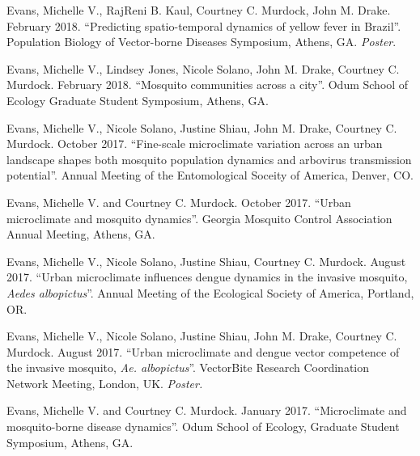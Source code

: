 
\begin{cvitems}
	\bigskip

	\item Evans, Michelle V., RajReni B. Kaul, Courtney C. Murdock, John M. Drake. February 2018. ``Predicting spatio-temporal dynamics of yellow fever in Brazil''. Population Biology of Vector-borne Diseases Symposium, Athens, GA. \textit{Poster}.

	\item Evans, Michelle V., Lindsey Jones, Nicole Solano, John M. Drake, Courtney C. Murdock. February 2018. ``Mosquito communities across a city''. Odum School of Ecology Graduate Student Symposium, Athens, GA.

	\item Evans, Michelle V., Nicole Solano, Justine Shiau, John M. Drake, Courtney C. Murdock. October 2017. ``Fine-scale microclimate variation across an urban landscape shapes both mosquito population dynamics and arbovirus transmission potential''. Annual Meeting of the Entomological Soceity of America, Denver, CO.

	\item Evans, Michelle V. and Courtney C. Murdock. October 2017. ``Urban microclimate and mosquito dynamics''. Georgia Mosquito Control Association Annual Meeting, Athens, GA.

	\item Evans, Michelle V., Nicole Solano, Justine Shiau, Courtney C. Murdock. August 2017. ``Urban microclimate influences dengue dynamics in the invasive mosquito, \textit{Aedes albopictus}''. Annual Meeting of the Ecological Society of America, Portland, OR.

	\item Evans, Michelle V., Nicole Solano, Justine Shiau, John M. Drake, Courtney C. Murdock. August 2017. ``Urban microclimate and dengue vector competence of the invasive mosquito, \textit{Ae. albopictus}''. VectorBite Research Coordination Network Meeting, London, UK. \textit{Poster.}

	\item Evans, Michelle V. and Courtney C. Murdock. January 2017. ``Microclimate and mosquito-borne disease dynamics''. Odum School of Ecology, Graduate Student Symposium, Athens, GA.


\end{cvitems}
